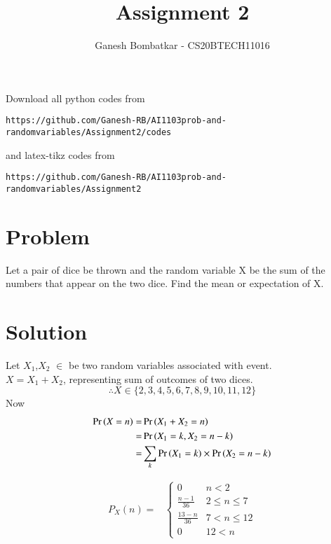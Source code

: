 \documentclass[journal,12pt,twocolumn]{IEEEtran}
\begin{document}
     \def\rightbox#1{\makebox[0in][r]{#1}}
     \def\centbox#1{\makebox[0in]{#1}}
     \def\topbox#1{\raisebox{-\baselineskip}[0in][0in]{#1}}
     \def\midbox#1{\raisebox{-0.5\baselineskip}[0in][0in]{#1}}
\vspace{3cm}
\title{Assignment 2}
\author{Ganesh Bombatkar - CS20BTECH11016}
\maketitle
\newpage
\bigskip
\renewcommand{\thefigure}{\theenumi}
\renewcommand{\thetable}{\theenumi}
Download all python codes from 
\vspace{0.1cm}
\begin{lstlisting}
https://github.com/Ganesh-RB/AI1103prob-and-randomvariables/Assignment2/codes
\end{lstlisting}
%
\vspace{0.2cm}
and latex-tikz codes from 
%
\vspace{0.1cm}
\begin{lstlisting}
https://github.com/Ganesh-RB/AI1103prob-and-randomvariables/Assignment2
\end{lstlisting}

\section{Problem}
Let a pair of dice be thrown and the random variable X be the sum of the numbers that appear on the two dice. Find the mean or expectation of X.
\vspace{0.1cm}

\section{Solution}
Let $X_1$,$X_2$ $\in$  be two random variables associated with event.
\\ $X=X_1+X_2$, representing sum of outcomes of two dices.
$$\therefore X\in \{2,3,4,5,6,7,8,9,10,11,12\}$$
Now
\begin{align}
    \Pr\left(X=n\right) =& \Pr\left(X_1+X_2=n\right)
    \\       =& \Pr\left(X_1=k,X_2=n-k\right)
    \\       =& \sum_k{\Pr\left(X_1=k\right) \times \Pr\left(X_2=n-k\right)}
\end{align}   

\begin{align}
    P_X{(n)} =&
    \begin{cases}
    0 & n<2
    \\ \frac{n-1}{36} &2 \le n \le 7
    \\ \frac{13-n}{36} & 7 < n \le 12
    \\ 0 & 12 < n
    \end{cases}
    \label{pmf_equation}
\end{align}
\end{document}
